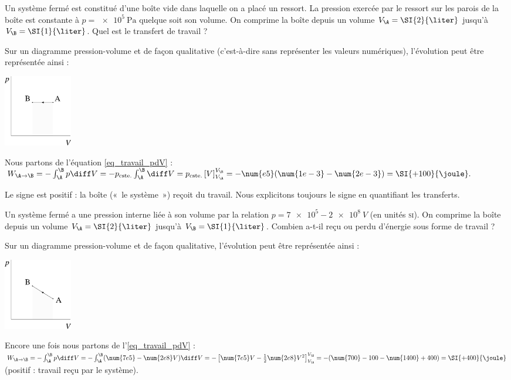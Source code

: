 		\begin{anexample}
			
			Un système fermé est constitué d’une boîte vide dans laquelle on a placé un ressort. La pression exercée par le ressort sur les parois de la boîte est constante à $p = \SI{e5}{\pascal}$ quelque soit son volume. On comprime la boîte depuis un volume $V_\A = \SI{2}{\liter}$ jusqu’à $V_\B = \SI{1}{\liter}$. Quel est le transfert de travail ?
				\begin{answer}
						Sur un diagramme pression-volume et de façon qualitative (c’est-à-dire sans représenter les valeurs numériques), l’évolution peut être représentée ainsi :
							\begin{center}
								\includegraphics[width=3cm]{images/ex_pv_isobare.png}
							\end{center}
					Nous partons de l’équation \ref{eq_travail_pdV} : $W_{\A\to\B} = - \int_\A^\B p \diff V = - p_\text{cste.} \int_\A^\B \diff V = p_\text{cste.} \left[V\right]_{V_\A}^{V_\B } = - \num{e5} (\num{1e-3} - \num{2e-3}) = \SI{+100}{\joule}.$
					\begin{remark}Le signe est positif : la boîte («~le système~») reçoit du travail. Nous explicitons toujours le signe en quantifiant les transferts.\end{remark}
				\end{answer}
		\end{anexample}


		\begin{anexample}
			Un système fermé a une pression interne liée à son volume par la relation $p = \num{7e5} - \num{2e8} \ V$ (en unités \textsc{si}). On comprime la boîte depuis un volume $V_\A = \SI{2}{\liter}$ jusqu’à $V_\B = \SI{1}{\liter}$. Combien a-t-il reçu ou perdu d’énergie sous forme de travail ?
				\begin{answer}
						Sur un diagramme pression-volume et de façon qualitative, l’évolution peut être représentée ainsi :
							\begin{center}
								\includegraphics[width=3cm]{images/ex_pv_prop.png}
							\end{center}
					Encore une fois nous partons de l’\cref{eq_travail_pdV} : $W_{\A\to\B} = - \int_\A^\B p \diff V = - \int_\A^\B (\num{7e5} - \num{2e8} V) \diff V = - \left[\num{7e5}V - \frac{1}{2}\num{2e8} V^2\right]_{V_\A}^{V_\B } = - (\num{700} - 100 - \num{1400} + 400) = \SI{+400}{\joule}$ (positif : travail reçu par le système).
				\end{answer}
		\end{anexample}
		

